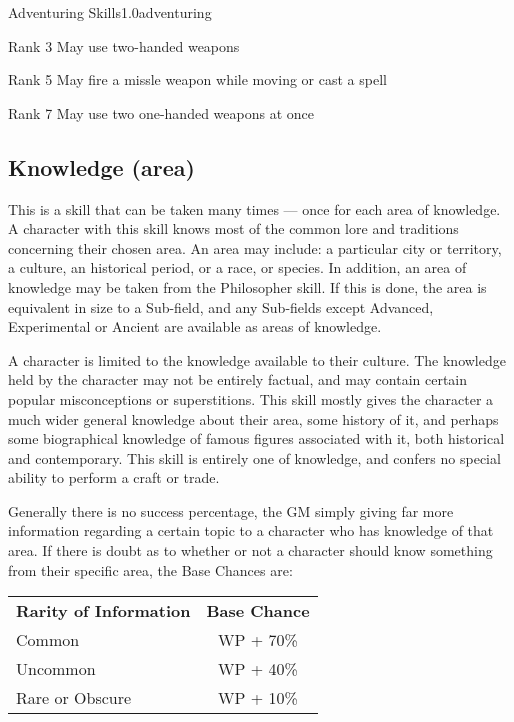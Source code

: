 \begin{skill}{Adventuring Skills}{1.0}{adventuring}
\begin{Description}
\item[Rank 3] May use two-handed weapons 
\item[Rank 5] May fire a missle weapon while moving or cast a spell
\item[Rank 7] May use two one-handed weapons at once
\end{Description}

\subsection{Knowledge (area)}
\label{skills:knowledge}

This is a skill that can be taken many times --- once for each area of
knowledge. A character with this skill knows most of the common lore
and traditions concerning their chosen area. An area may include: a
particular city or territory, a culture, an historical period, or a
race, or species. In addition, an area of knowledge may be taken from
the Philosopher skill. If this is done, the area is equivalent in size
to a Sub-field, and any Sub-fields except Advanced, Experimental or
Ancient are available as areas of knowledge.

A character is limited to the knowledge available to their
culture. The knowledge held by the character may not be entirely
factual, and may contain certain popular misconceptions or
superstitions. This skill mostly gives the character a much wider
general knowledge about their area, some history of it, and perhaps
some biographical knowledge of famous figures associated with it, both
historical and contemporary. This skill is entirely one of knowledge,
and confers no special ability to perform a craft or trade.

Generally there is no success percentage, the GM simply giving far
more information regarding a certain topic to a character who has
knowledge of that area.  If there is doubt as to whether or not a
character should know something from their specific area, the Base
Chances are:

\begin{tabular}{lc}
\textbf{Rarity of Information}	& \textbf{Base Chance} \\
Common			& WP + 70\% \\
Uncommon		& WP + 40\% \\
Rare or Obscure		& WP + 10\% \\
\end{tabular}


\end{skill}
